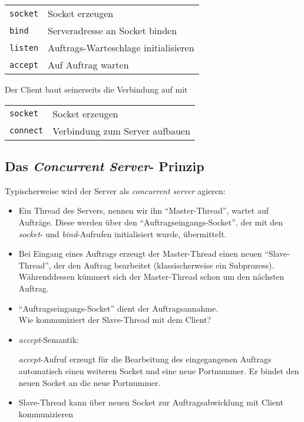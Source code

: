 \documentclass[12pt,utf8]{article}
\begin{document}
\begin{tabular}{ll}
{\tt socket} & Socket erzeugen \\
{\tt bind} & Serveradresse an Socket binden \\
{\tt listen} & Auftrags-Warteschlage initialisieren \\
{\tt accept} & Auf Auftrag warten \\
\end{tabular}

\vspace*{2em} 

Der Client baut seinerseits die Verbindung auf mit

\begin{tabular}{ll}
{\tt socket} & Socket erzeugen \\
{\tt connect} & Verbindung zum Server aufbauen \\
\end{tabular}



\subsection*{Das {\em Concurrent Server\/}- Prinzip}

Typischerweise wird der Server als {\em concurrent server\/} agieren:

\begin{itemize} 
\item 
Ein Thread des Servers, nennen wir ihn "`Master-Thread"', wartet auf
Aufträge. Diese werden über den "`Auftragseingangs-Socket"', der mit den
{\em socket\/}- und {\em bind\/}-Aufrufen initialisiert wurde,
übermittelt.  

\item Bei Eingang eines Auftrags erzeugt der Master-Thread
einen neuen "`Slave-Thread"', der den Auftrag bearbeitet
(klassischerweise ein Subprozess).  Währenddessen kümmert sich der
Master-Thread schon um den nächsten Auftrag.


\item 
"`Auftragseingangs-Socket"' dient der Auftragsannahme.\\
Wie kommuniziert der Slave-Thread mit dem Client?

\item {\em accept\/}-Semantik:

{\em accept\/}-Aufruf erzeugt für die Bearbeitung des eingegangenen
Auftrags automatisch einen weiteren Socket und eine neue Portnummer.
Er bindet den neuen Socket an die neue Portnummer.

\item 
Slave-Thread kann über neuen Socket zur Auftragsabwicklung mit
Client kommunizieren
\end{itemize}
\end{document}
